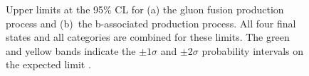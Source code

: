 \begin{figure}[h!]
\begin{center}
\end{center}
\caption[Upper limits at the 95\% CL for the gluon fusion production process and the
b-associated production process, combining all final states and categories.]{Upper limits at the 95\% CL for (a) the gluon fusion production
process and (b)~the b-associated production process. All four final states and 
all categories are combined for these limits. The green and yellow bands indicate
the $\pm 1\sigma$ and $\pm 2\sigma$ probability intervals on the expected limit \cite{CMS-PAS-HIG-16-037}.}
\label{fig:mssm_results_limits}
\end{figure}

